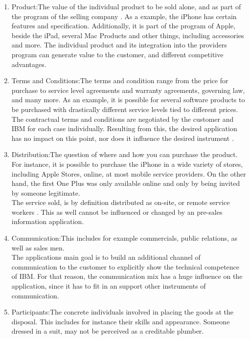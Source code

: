 \begin{enumerate}
    \item{Product:}The value of the individual product to be sold alone, and as part of the program of the selling company \parencite[cf.][398]{Meffert.2015}. As a example, the iPhone has certain features and specification. Additionally, it is part of the program of Apple, beside the iPad, several Mac Products and other things, including accessories and more. The individual product and its integration into the providers program can generate value to the customer, and different competitive advantages.
    \item{Terms and Conditions:}The terms and condition range from the price for purchase to service level agreements and warranty agreements, governing law, and many more. As an example, it is possible for several software products to be purchased with drastically different service levels tied to different prices. \\
    The contractual terms and conditions are negotiated by the customer and IBM for each case individually. Resulting from this, the desired application has no impact on this point, nor does it influence the desired instrument \parencite[cf.][]{Sachs.20.04.2017}.
    \item{Distribution:}The question of where and how you can purchase the product. For instance, it is possible to purchase the iPhone in a wide variety of stores, including Apple Stores, online, at most mobile service providers. On the other hand, the first One Plus was only available online and only by being invited by someone legitimate.\\
    The service sold, is by definition distributed as on-site, or remote service workers \parencite[cf.][]{Sachs.20.04.2017}. This as well cannot be influenced or changed by an pre-sales information application.
    \item{Communication:}This includes for example commercials, public relations, as well as sales men. \\
    The applications main goal is to build an additional channel of communication to the customer to explicitly show the technical competence of IBM. For that reason, the communication mix has a huge influence on the application, since it has to fit in an support other instruments of communication.
    \item{Participants:}The concrete individuals involved in placing the goods at the disposal. This includes for instance their skills and appearance. Someone dressed in a suit, may not be perceived as a creditable plumber. \\ 

\end{enumerate}

